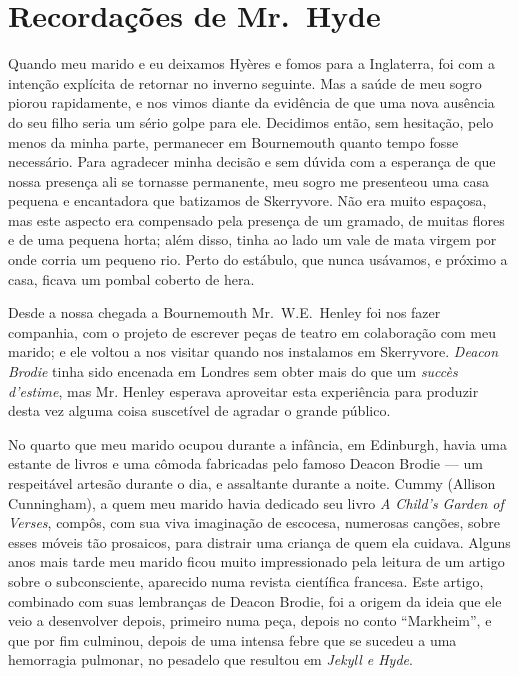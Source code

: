 \chapter[Recordações de Mr.~Hyde\\ \textit{Fanny Van de Grift"-Stevenson}]{Recordações de Mr.~Hyde}

Quando meu marido e eu deixamos Hyères e fomos para a Inglaterra, foi
com a intenção explícita de retornar no inverno seguinte.  Mas a saúde
de meu sogro piorou rapidamente, e nos vimos diante da evidência de que
uma nova ausência do seu filho seria um sério golpe para ele. 
Decidimos então, sem hesitação, pelo menos da minha parte, permanecer
em Bournemouth quanto tempo fosse necessário.  Para agradecer minha
decisão e sem dúvida com a esperança de que nossa presença ali se
tornasse permanente, meu sogro me presenteou uma casa pequena e
encantadora que batizamos de Skerryvore.  Não era muito espaçosa, mas
este aspecto era compensado pela presença de um gramado, de muitas
flores e de uma pequena horta; além disso, tinha ao lado um vale de
mata virgem por onde corria um pequeno rio.  Perto do estábulo, que
nunca usávamos, e próximo a casa, ficava um pombal coberto de hera.

Desde a nossa chegada a Bournemouth Mr.~W.E.~Henley foi nos fazer
companhia, com o projeto de escrever peças de teatro em colaboração com
meu marido; e ele voltou a nos visitar quando nos instalamos em
Skerryvore.  \textit{Deacon Brodie} tinha sido encenada em Londres sem
obter mais do que um \textit{succès d’estime}, mas Mr. Henley esperava
aproveitar esta experiência para produzir desta vez alguma coisa
suscetível de agradar o grande público.

No quarto que meu marido ocupou durante a infância, em Edinburgh, havia
uma estante de livros e uma cômoda fabricadas pelo famoso Deacon Brodie
--- um respeitável artesão durante o dia, e assaltante durante a noite. 
Cummy (Allison Cunningham), a quem meu marido havia dedicado seu livro
\textit{A Child’s Garden of Verses}, compôs, com sua viva imaginação de
escocesa, numerosas canções, sobre esses móveis tão prosaicos, para
distrair uma criança de quem ela cuidava.  Alguns anos mais tarde meu
marido ficou muito impressionado pela leitura de um artigo sobre o
subconsciente, aparecido numa revista científica francesa.  Este
artigo, combinado com suas lembranças de Deacon Brodie, foi a origem da
ideia que ele veio a desenvolver depois, primeiro numa peça, depois no
conto “Markheim”, e que por fim culminou, depois de uma intensa febre
que se sucedeu a uma hemorragia pulmonar, no pesadelo que resultou em
\textit{Jekyll e Hyde}.

